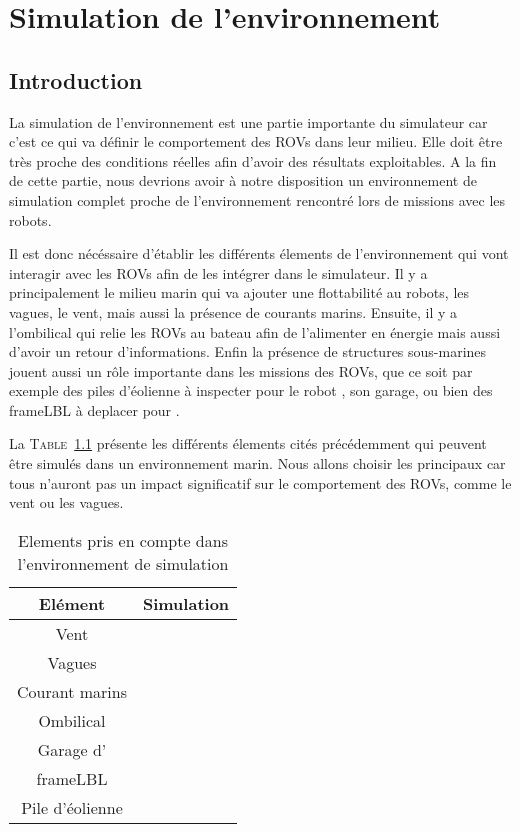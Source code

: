 \chapter{Simulation de l'environnement}
\label{chapitre:environnement}
	
	\section{Introduction}

		La simulation de l'environnement est une partie importante du simulateur car c'est ce qui va définir le comportement des \gls{ROV}s dans leur milieu. Elle doit être très proche des conditions réelles afin d'avoir des résultats exploitables. A la fin de cette partie, nous devrions avoir à notre disposition un environnement de simulation complet proche de l'environnement rencontré lors de missions avec les robots.

		Il est donc nécéssaire d'établir les différents élements de l'environnement qui vont interagir avec les \gls{ROV}s afin de les intégrer dans le simulateur. Il y a principalement le milieu marin qui va ajouter une flottabilité au robots, les vagues, le vent, mais aussi la présence de courants marins. Ensuite, il y a l'ombilical qui relie les \gls{ROV}s au bateau afin de l'alimenter en énergie mais aussi d'avoir un retour d'informations. Enfin la présence de structures sous-marines jouent aussi un rôle importante dans les missions des \gls{ROV}s, que ce soit par exemple des piles d'éolienne à inspecter pour le robot \argos{}, son garage, ou bien des \gls{frameLBL} à deplacer pour \atoll{}.

		La \textsc{Table}~\ref{table:elements} présente les différents élements cités précédemment qui peuvent être simulés dans un environnement marin. Nous allons choisir les principaux car tous n'auront pas un impact significatif sur le comportement des \gls{ROV}s, comme le vent ou les vagues. 

		\begin{table}[ht]
			\centering
			\begin{tabular}{|c|c|}
				\hline
				\textbf{Elément} & \textbf{Simulation} \\
				\hline
				Vent & \xmark\\
				\hline
				Vagues & \xmark\\
				\hline
				Courant marins & \cmark \\
				\hline
				Ombilical & \cmark \\
				\hline
				Garage d'\argos{} & \cmark \\
				\hline
				\gls{frameLBL} & \cmark \\
				\hline
				Pile d'éolienne & \cmark \\
				\hline
			\end{tabular}
			\caption{Elements pris en compte dans l'environnement de simulation}
			\label{table:elements}
		\end{table}

